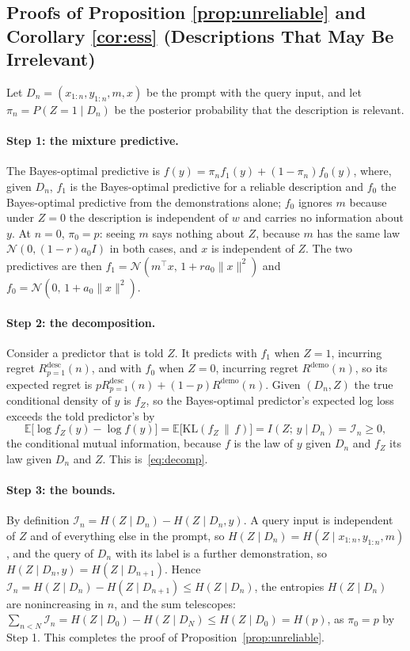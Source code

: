 \documentclass{article}
\newcommand{\E}{\mathbb{E}}
\begin{document}
\subsection{Proofs of Proposition \ref{prop:unreliable} and Corollary \ref{cor:ess} (Descriptions That May Be Irrelevant)}\label{app:reliability}
Let $D_n = (x_{1:n}, y_{1:n}, m, x)$ be the prompt with the query input, and let $\pi_n = P(Z = 1 \mid D_n)$ be the posterior probability that the description is relevant.

\paragraph{Step 1: the mixture predictive.}
The Bayes-optimal predictive is $f(y) = \pi_n f_1(y) + (1 - \pi_n) f_0(y)$, where, given $D_n$, $f_1$ is the Bayes-optimal predictive for a reliable description and $f_0$ the Bayes-optimal predictive from the demonstrations alone; $f_0$ ignores $m$ because under $Z = 0$ the description is independent of $w$ and carries no information about $y$. At $n = 0$, $\pi_0 = p$: seeing $m$ says nothing about $Z$, because $m$ has the same law $\mathcal{N}(0, (1-r) a_0 I)$ in both cases, and $x$ is independent of $Z$. The two predictives are then $f_1 = \mathcal{N}(m^\top x,\, 1 + r a_0\|x\|^2)$ and $f_0 = \mathcal{N}(0,\, 1 + a_0\|x\|^2)$.

\paragraph{Step 2: the decomposition.}
Consider a predictor that is told $Z$. It predicts with $f_1$ when $Z=1$, incurring regret $R^{\mathrm{desc}}_{p=1}(n)$, and with $f_0$ when $Z=0$, incurring regret $R^{\mathrm{demo}}(n)$, so its expected regret is $p R^{\mathrm{desc}}_{p=1}(n) + (1-p) R^{\mathrm{demo}}(n)$. Given $(D_n, Z)$ the true conditional density of $y$ is $f_Z$, so the Bayes-optimal predictor's expected log loss exceeds the told predictor's by
\[
\E\big[\log f_Z(y) - \log f(y)\big] = \E\big[\mathrm{KL}(f_Z \,\|\, f)\big] = I(Z;\, y \mid D_n) = \mathcal{I}_n \ge 0,
\]
the conditional mutual information, because $f$ is the law of $y$ given $D_n$ and $f_Z$ its law given $D_n$ and $Z$. This is~\eqref{eq:decomp}.

\paragraph{Step 3: the bounds.}
By definition $\mathcal{I}_n = H(Z \mid D_n) - H(Z \mid D_n, y)$. A query input is independent of $Z$ and of everything else in the prompt, so $H(Z \mid D_n) = H(Z \mid x_{1:n}, y_{1:n}, m)$, and the query of $D_n$ with its label is a further demonstration, so $H(Z \mid D_n, y) = H(Z \mid D_{n+1})$. Hence $\mathcal{I}_n = H(Z \mid D_n) - H(Z \mid D_{n+1}) \le H(Z \mid D_n)$, the entropies $H(Z \mid D_n)$ are nonincreasing in $n$, and the sum telescopes: $\sum_{n < N} \mathcal{I}_n = H(Z \mid D_0) - H(Z \mid D_N) \le H(Z \mid D_0) = H(p)$, as $\pi_0 = p$ by Step 1. This completes the proof of Proposition~\ref{prop:unreliable}.
\end{document}
